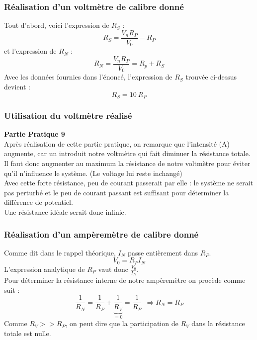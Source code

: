 \documentclass	[11pt, a4paper, openany]{book}
\begin{document}
		\subsubsection*{Réalisation d'un voltmètre de calibre donné}
		Tout d'abord, voici l'expression de $R_S$ :
		\begin{equation}
			R_S = \frac{V_n R_P}{V_0} - R_P
		\end{equation}
		et l'expression de $R_N$ :
		\begin{equation}
			R_N = \frac{V_n R_P}{V_0} = R_p + R_S
		\end{equation}
		Avec les données fournies dans l'énoncé, l'expression de $R_S$ trouvée ci-dessus devient : 
		\begin{equation}
			R_S = 10\ R_P
		\end{equation}
		
		\subsubsection*{Utilisation du voltmètre réalisé}
		\textbf{Partie Pratique 9}\\
		Après réalisation de cette partie pratique, on remarque que l'intensité (A) augmente, car un introduit notre voltmètre qui fait diminuer la résistance totale. Il faut donc augmenter au maximum la résistance de notre voltmètre pour éviter qu'il n'influence le système. (Le voltage lui reste inchangé)\\
		
		Avec cette forte résistance, peu de courant passerait par elle : le système ne serait pas perturbé et le peu de courant passant est suffisant pour déterminer la différence de potentiel. \\
		Une résistance idéale serait donc infinie.
		
		\subsubsection*{Réalisation d'un ampèremètre de calibre donné}
		Comme dit dans le rappel théorique, $I_N$ passe entièrement dans $R_P$.
		\begin{equation}
			V_0 = R_P I_N
		\end{equation}
		L'expression analytique de $R_P$ vaut donc $\frac{V_0}{I_N}$.\\
		
		Pour déterminer la résistance interne de notre ampèremètre on procède comme suit : 
		\begin{equation}
			\frac{1}{R_N} = \frac{1}{R_P} + \underbrace{\frac{1}{R_V}}_{= 0} = \frac{1}{R_P}\ \ \Rightarrow R_N = R_P
		\end{equation}
		Comme $R_V >> R_P$, on peut dire que la participation de $R_V$ dans la résistance totale est nulle.\\
		
\end{document}
